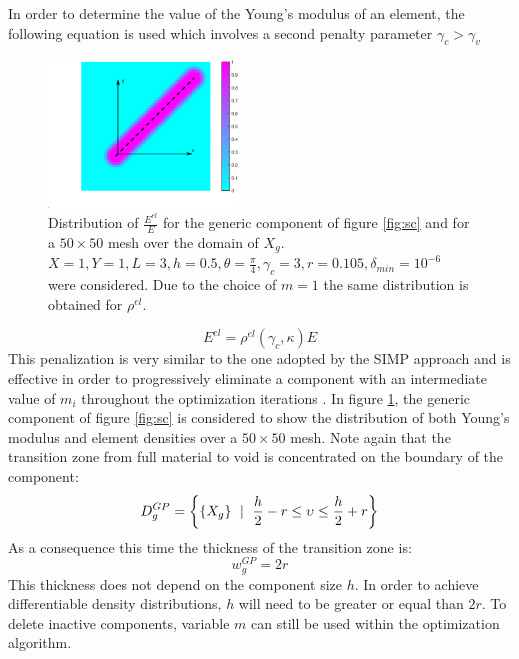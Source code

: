 In order to determine the value of the Young's modulus of an element, the following equation is used which involves a second penalty parameter $\gamma_c>\gamma_v$ 
\begin{figure}[!ht]
\centering
  \includegraphics[width=0.45\textwidth]{images/Ch3/gpe.eps}
\caption{Distribution of $ \frac{E^{el}}{E}$  for the generic component of figure \ref{fig:sc} and for a $50\times50$ mesh over the domain of $X_g$. $X=1,Y=1,L=3,h=0.5,\theta=\frac{\pi}{4}, \gamma_c=3, r=0.105, \delta_{min}=10^{-6} $ were considered. Due to the choice of $m=1$  the same distribution is obtained for $\rho^{el}$.}
\label{fig:gpe}       %
\end{figure}
\begin{equation}
    E^{el}=\rho^{el}(\gamma_c ,\kappa)E
\end{equation}
This penalization is very similar to the one adopted by the SIMP approach and is effective in order to progressively eliminate a component with an intermediate value of $m_i$ throughout the optimization iterations \cite{norato2015geometry}. 
In figure \ref{fig:gpe}, the generic component of figure \ref{fig:sc} is considered to show the distribution of both Young's modulus and element densities over a $50\times50$ mesh. Note again that the transition zone from full material to void is concentrated on the boundary of the component:
\begin{equation}
D_g^{GP}=\left\lbrace \left\{{X_g}\right\}\ \mid \  \frac{h}{2}-r\leq \upsilon \leq  \frac{h}{2}+r\right\rbrace    
\end{equation}
As a consequence this time the thickness of the transition zone is:
\begin{equation}
    w_g^{GP}=2r
\end{equation}
This thickness does not depend on the component size $h$. In order to achieve differentiable density distributions, $h$ will need to be greater or equal than $2r$. To delete inactive components, variable $m$  can still be used within the optimization algorithm.
